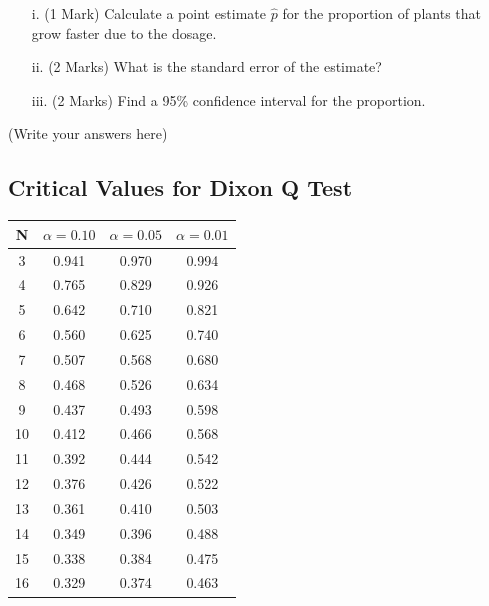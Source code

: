 \documentclass[a4paper,12pt]{article}
\begin{document}
\begin{itemize}
	\item[i.] (1 Mark) Calculate a point estimate $\hat{p}$ for the proportion of plants that grow faster due to the dosage. 									 
	\item[ii.] (2 Marks)  What is the standard error of the estimate? 			
	\item[iii.] (2 Marks) Find a 95\% confidence interval for the proportion. 					
\end{itemize}
\newpage
(Write your answers here)
\newpage
\subsection*{Critical Values for Dixon Q Test}
{
	\Large
	\begin{center}
		\begin{tabular}{|c|c|c|c|}
			\hline  N  & $\alpha=0.10$  & $\alpha=0.05$  & $\alpha=0.01$  \\ \hline
			3  & 0.941 & 0.970 & 0.994 \\ \hline
			4  & 0.765 & 0.829 & 0.926 \\ \hline
			5  & 0.642 & 0.710  & 0.821 \\ \hline
			6  & 0.560 & 0.625 & 0.740 \\ \hline
			7  & 0.507 & 0.568 & 0.680  \\ \hline
			8  & 0.468 & 0.526 & 0.634 \\ \hline
			9  & 0.437 & 0.493 & 0.598 \\ \hline
			10 & 0.412 & 0.466 & 0.568 \\ \hline
			11 & 0.392 & 0.444 & 0.542 \\ \hline
			12 & 0.376 & 0.426 & 0.522 \\ \hline
			13 & 0.361 & 0.410 & 0.503 \\ \hline
			14 & 0.349 & 0.396 & 0.488 \\ \hline
			15 & 0.338 & 0.384 & 0.475 \\ \hline
			16 & 0.329 & 0.374 & 0.463 \\ \hline
		\end{tabular} 
	\end{center}
}
\end{document}
